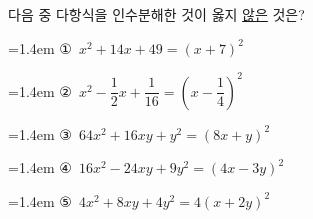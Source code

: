 다음 중 다항식을 인수분해한 것이 옳지 \underline{않은} 것은?
\par\medskip\par\noindent\hangindent=1.4em {\small ①}\ $x^2+14x+49=(x+7)^2$\par\noindent\hangindent=1.4em {\small ②}\ $x^2-\dfrac{1}{2}x+\dfrac{1}{16}=\left(x-\dfrac{1}{4}\right)^2$\par\noindent\hangindent=1.4em {\small ③}\ $64x^2+16xy+y^2=(8x+y)^2$\par\noindent\hangindent=1.4em {\small ④}\ $16x^2-24xy+9y^2=(4x-3y)^2$\par\noindent\hangindent=1.4em {\small ⑤}\ $4x^2+8xy+4y^2=4(x+2y)^2$\par\medskip
